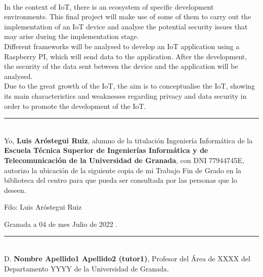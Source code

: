 \vspace{0.7cm}
\\

In the context of IoT, there is an ecosystem of specific development environments. This final project will make use of some of them to carry out the implementation of an IoT device and analyse the potential security issues that may arise during the implementation stage. \\

Different frameworks will be analysed to develop an IoT application using a Raspberry PI, which will send data to the application. After the development, the security of the data sent between the device and the application will be analysed. \\

Due to the great growth of the IoT, the aim is to conceptualise the IoT, showing its main characteristics and weaknesses regarding privacy and data security in order to promote the development of the IoT.

\cleardoublepage
\thispagestyle{empty}

\noindent\rule[-1ex]{\textwidth}{2pt}\\[4.5ex]

Yo, \textbf{Luis Aróstegui Ruiz}, alumno de la titulación Ingeniería Informática de la \textbf{Escuela Técnica Superior
de Ingenierías Informática y de Telecomunicación de la Universidad de Granada}, con DNI 77944745E, autorizo la
ubicación de la siguiente copia de mi Trabajo Fin de Grado en la biblioteca del centro para que pueda ser
consultada por las personas que lo deseen.

\vspace{6cm}

\noindent Fdo: Luis Aróstegui Ruiz

\vspace{2cm}

\begin{flushright}
Granada a 04 de mes Julio de 2022 .
\end{flushright}

\cleardoublepage
\thispagestyle{empty}

\noindent\rule[-1ex]{\textwidth}{2pt}\\[4.5ex]

D. \textbf{Nombre Apellido1 Apellido2 (tutor1)}, Profesor del Área de XXXX del Departamento YYYY de la Universidad de Granada.

\vspace{0.5cm}

